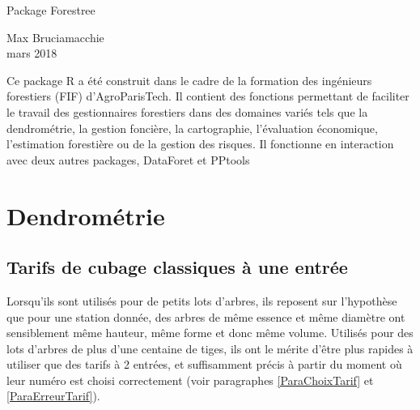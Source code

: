 \documentclass{article}\usepackage[]{graphicx}\usepackage[]{color}
\begin{document}
\begin{center}
\begin{LARGE}
Package Forestree\\
\end{LARGE}
Max Bruciamacchie\\
mars 2018\\
\end{center}

\vspace{2cm}
Ce package R a été construit dans le cadre de la formation des ingénieurs forestiers (FIF) d'AgroParisTech. Il contient des fonctions permettant de faciliter le travail des gestionnaires forestiers dans des domaines variés tels que la dendrométrie, la gestion foncière, la cartographie, l'évaluation économique, l'estimation forestière ou de la gestion des risques. Il fonctionne en interaction avec deux autres packages, DataForet et PPtools\\


\tableofcontents

\newpage
\section{Dendrométrie}

\subsection{Tarifs de cubage classiques à une entrée}
Lorsqu'ils sont utilisés pour de petits lots d'arbres, ils reposent sur l'hypothèse que pour une station donnée, des arbres de même essence et même diamètre ont sensiblement même hauteur, même forme et donc même volume. Utilisés pour des lots d'arbres de plus d'une centaine de tiges, ils ont le mérite d'être plus rapides à utiliser que des tarifs à 2 entrées, et suffisamment précis à partir du moment où leur numéro est choisi correctement (voir paragraphes \ref{ParaChoixTarif} et \ref{ParaErreurTarif}).
\end{document}

